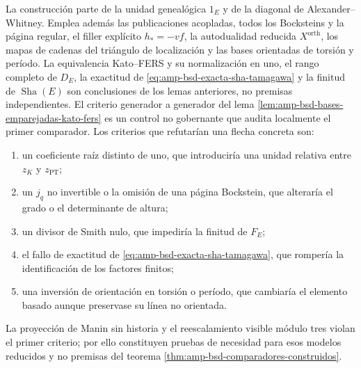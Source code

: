 La construcción parte de la unidad genealógica \(1_E\) y de la diagonal de
Alexander--Whitney. Emplea además las
publicaciones acopladas, todos los
Bocksteins y la página regular, el filler explícito \(h_*=-vf\), la
autodualidad reducida \(X^{\mathrm{orth}}\), los mapas de cadenas del
triángulo de localización y las bases orientadas de torsión y período. La equivalencia
Kato--FERS y su normalización en uno, el rango completo de \(D_E\), la
exactitud de \eqref{eq:amp-bsd-exacta-sha-tamagawa} y la finitud de
\(\operatorname{Sha}(E)\) son conclusiones de los lemas anteriores, no
premisas independientes. El criterio generador a generador del lema
\ref{lem:amp-bsd-bases-emparejadas-kato-fers} es un control no gobernante
que audita localmente el primer comparador. Los criterios que refutarían una flecha concreta
son:
\begin{enumerate}
 \item un coeficiente raíz distinto de uno, que introduciría una unidad
       relativa entre \(z_K\) y \(z_{\mathrm{PT}}\);
 \item un \(j_q\) no invertible o la omisión de una página Bockstein, que
       alteraría el grado o el determinante de altura;
 \item un divisor de Smith nulo, que impediría la finitud de \(F_E\);
 \item el fallo de exactitud de
       \eqref{eq:amp-bsd-exacta-sha-tamagawa}, que rompería la identificación
       de los factores finitos;
 \item una inversión de orientación en torsión o período, que cambiaría el
       elemento basado aunque preservase su línea no orientada.
\end{enumerate}
La proyección de Manin sin historia y el reescalamiento visible módulo tres
violan el primer criterio; por ello constituyen pruebas de necesidad para
esos modelos reducidos y no premisas del teorema
\ref{thm:amp-bsd-comparadores-construidos}.
